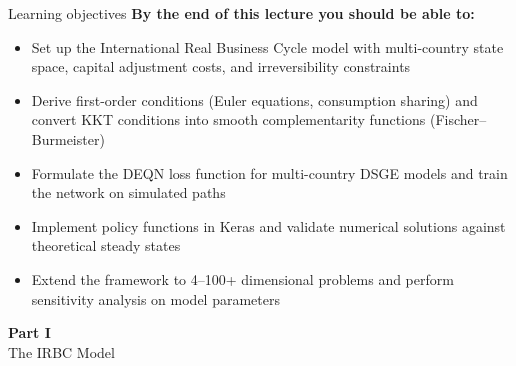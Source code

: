 \documentclass[aspectratio=169,11pt]{beamer}
\begin{document}
\begin{frame}{Learning objectives}
\textbf{By the end of this lecture you should be able to:}
\begin{itemize}
  \item Set up the International Real Business Cycle model with multi-country state space, capital adjustment costs, and irreversibility constraints
  \item Derive first-order conditions (Euler equations, consumption sharing) and convert KKT conditions into smooth complementarity functions (Fischer--Burmeister)
  \item Formulate the DEQN loss function for multi-country DSGE models and train the network on simulated paths
  \item Implement policy functions in Keras and validate numerical solutions against theoretical steady states
  \item Extend the framework to 4--100+ dimensional problems and perform sensitivity analysis on model parameters
\end{itemize}
\end{frame}



\begin{frame}{}
\vfill
\begin{center}
{\Huge \textcolor{uzhblue}{\textbf{Part I}}}\\[12pt]
{\LARGE The IRBC Model}
\end{center}
\vfill
\end{frame}
\end{document}
